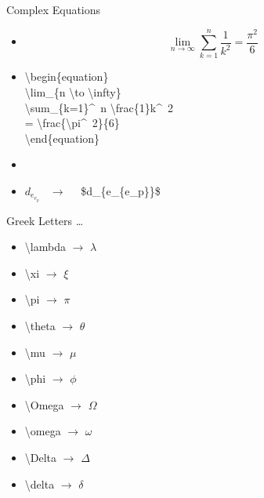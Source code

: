 \documentclass{beamer}
\begin{document}
\begin{frame}{Complex Equations}
\begin{itemize}
\pause \item[]\begin{flushleft}
 \begin{equation*}
 \lim_{n \to \infty}
 \sum_{k=1}^n \frac{1}{k^2}
 = \frac{\pi^2}{6}
\end{equation*}
\end{flushleft}
\pause \item[] \begin{flushleft}
 \textbackslash begin\{equation\}\\
\textbackslash lim\_\{n \textbackslash to \textbackslash infty\}\\
\textbackslash sum\_\{k=1\}\^~n \textbackslash frac\{1\}{k\^~2}\\
 = \textbackslash frac\{\textbackslash pi\^~2\}\{6\}\\
\textbackslash end\{equation\}
\end{flushleft}
\pause \item[]
\pause \item $d_{e_{e_p}}$ ~$\rightarrow$~~ \$d\_\{e\_\{e\_p\}\}\$
\end{itemize}
\end{frame}

\begin{frame}{Greek Letters \ldots}
\begin{itemize}
\pause \item \textbackslash lambda $\rightarrow$ $\lambda $ \\
\pause \item \textbackslash xi $\rightarrow$ $\xi$ \\
\pause \item \textbackslash pi $\rightarrow$ $\pi$ \\
\pause \item \textbackslash theta $\rightarrow$ $\theta$ \\
\pause \item \textbackslash mu $\rightarrow$ $\mu$ \\
\pause \item \textbackslash phi $\rightarrow$ $\phi$ \\
\pause \item \textbackslash Omega $\rightarrow$ $\Omega$ \\
\pause \item \textbackslash omega $\rightarrow$ $\omega$ \\
\pause \item \textbackslash Delta $\rightarrow$ $\Delta$ \\
\pause \item \textbackslash delta $\rightarrow$ $\delta$ \\
\end{itemize}
\end{frame}
\end{document}

